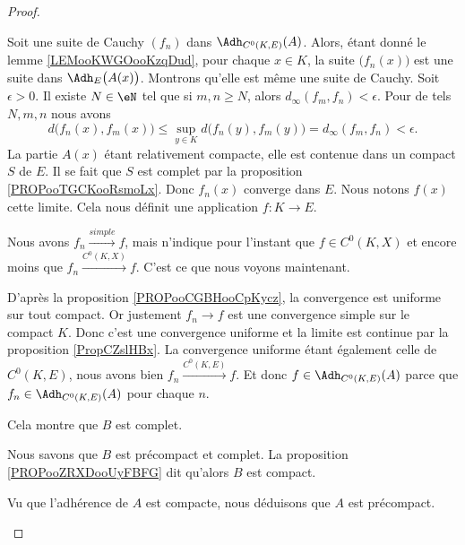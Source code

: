 \begin{proof}
\begin{subproof}
\begin{subproof}
			Soit une suite de Cauchy \( (f_n)\) dans \( \Adh_{C^0(K,E)}(A)\). Alors, étant donné le lemme \ref{LEMooKWGOooKzqDud}, pour chaque \( x\in K\), la suite \(  \big( f_n(x) \big) \) est une suite dans \( \Adh_E\big( A(x) \big)\). Montrons qu'elle est même une suite de Cauchy. Soit \( \epsilon>0\). Il existe \( N\in \eN\) tel que si \( m,n\geq N\), alors \( d_{\infty}(f_m,f_n)< \epsilon\). Pour de tels \( N,m,n\) nous avons
			\begin{equation}
				d\big( f_n(x),f_m(x) \big)\leq \sup_{y\in K} d\big( f_n(y),f_m(y) \big)=d_{\infty}(f_m,f_n)<\epsilon.
			\end{equation}
			La partie \( A(x)\) étant relativement compacte, elle est contenue dans un compact \( S\) de \( E\). Il se fait que \( S\) est complet par la proposition \ref{PROPooTGCKooRsmoLx}. Donc \( f_n(x)\) converge dans \( E\). Nous notons \( f(x)\) cette limite. Cela nous définit une application \(f \colon K\to E  \).

			Nous avons \( f_n\stackrel{ simple}{\longrightarrow} f\), mais n'indique pour l'instant que \( f\in C^0(K,X)\) et encore moins que \( f_n\stackrel{ C^0(K,X)}{\longrightarrow} f\). C'est ce que nous voyons maintenant.

			D'après la proposition \ref{PROPooCGBHooCpKycz}, la convergence est uniforme sur tout compact. Or justement \( f_n\to f\) est une convergence simple sur le compact \( K\). Donc c'est une convergence uniforme et la limite est continue par la proposition \ref{PropCZslHBx}. La convergence uniforme étant également celle de \( C^0(K,E)\), nous avons bien \( f_n\stackrel{ C^0(K,E)}{\longrightarrow} f\). Et donc \( f\in \Adh_{C^0(K,E)}(A)\) parce que \( f_n\in\Adh_{C^0(K,E)}(A)\) pour chaque \( n\).

			Cela montre que \( B\) est complet.

			Nous savons que \( B\) est précompact et complet. La proposition \ref{PROPooZRXDooUyFBFG} dit qu'alors \( B\) est compact.

			\spitem[Conclusion]
			Vu que l'adhérence de \( A\) est compacte, nous déduisons que \( A\) est précompact.
		\end{subproof}
	\end{subproof}
\end{proof}


